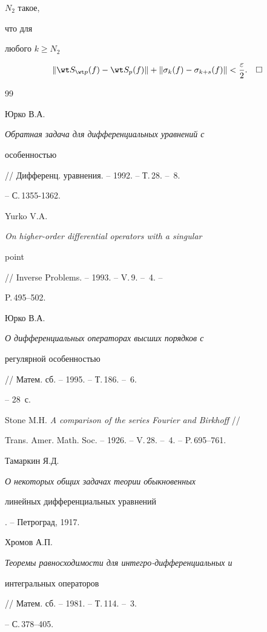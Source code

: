 $N_2$ такое,


что для


любого $k\ge N_2$


$$


\|\wt S_{\wt p}(f)-\wt S_p(f)\|+\|\sigma_k(f)-\sigma_{k+s}(f)\|<


\frac{\varepsilon}{2}.\quad\square


$$





\begin{thebibliography}{99}







Юрко В.А. {\em Обратная задача для дифференциальных уравнений с


особенностью} // Дифференц. уравнения. -- 1992. -- Т.\,28. -- \No\,8.


-- С.\,1355-1362.




Yurko V.A. {\em On higher-order differential operators with a singular


point} // Inverse Problems. -- 1993. -- V.\,9. -- \No\,4. --


P.\,495--502.




Юрко В.А. {\em О дифференциальных операторах высших порядков с


регулярной особенностью} // Матем. сб. -- 1995. -- Т.\,186. -- \No\,6.


-- 28~с.




Stone M.H. {\em A comparison of the series Fourier and Birkhoff} //


Trans. Amer. Math. Soc. -- 1926. -- V.\,28. -- \No\,4. -- P.\,695--761.




Тамаркин Я.Д. {\em О некоторых общих задачах теории обыкновенных


линейных дифференциальных уравнений}. -- Петроград, 1917.




Хромов А.П. {\em Теоремы равносходимости для интегро-дифференциальных и


интегральных операторов} // Матем. сб. -- 1981. -- Т.\,114. -- \No\,3.


-- С.\,378--405.





\end{thebibliography}
